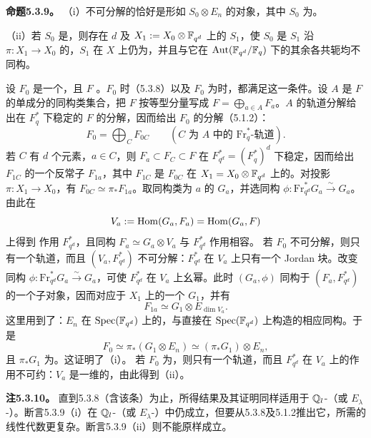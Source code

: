 \par\medskip\noindent\textbf{命题5.3.9。} （i）不可分解的恰好是形如 $S_0\otimes E_n$ 的对象，其中 $S_0$ 为。

（ii）若 $S_0$ 是，则存在 $d$ 及 $X_1:=X_0\otimes\mathbb F_{q^d}$ 上的 $S_1$，使 $S_0$ 是 $S_1$ 沿 $\pi:X_1\to X_0$ 的，$S_1$ 在 $X$ 上仍为，并且与它在 $\operatorname{Aut}(\mathbb F_{q^d}/\mathbb F_q)$ 下的其余各共轭均不同构。

设 $F_0$ 是一个，且 $F$ 。$F_0$ 时（5.3.8）以及 $F_0$ 为时，都满足这一条件。设 $A$ 是 $F$ 的单成分的同构类集合，把 $F$ 按等型分量写成 $F=\bigoplus_{a\in A}F_a$。$A$ 的轨道分解给出在 $F_q^*$ 下稳定的 $F$ 的分解，因而给出 $F_0$ 的分解（5.1.2）：
\[
F_0=\bigoplus_CF_{0C}\qquad(C\text{ 为 }A\text{ 中的 }\mathrm{Fr}_q^*\text{-轨道}).
\]
若 $C$ 有 $d$ 个元素，$a\in C$，则 $F_a\subset F_C\subset F$ 在 $F_{q^d}^*=(F_q^*)^d$ 下稳定，因而给出 $F_{1C}$ 的一个反常子 $F_{1a}$，其中 $F_{1C}$ 是 $F_{0C}$ 在 $X_1=X_0\otimes\mathbb F_{q^d}$ 上的。对投影 $\pi:X_1\to X_0$，有 $F_{0C}\simeq\pi_*F_{1a}$。取同构类为 $a$ 的 $G_a$，并选同构 $\phi:\mathrm{Fr}_{q^d}^*G_a\xrightarrow{\sim}G_a$。由此在
\[
V_a:=\operatorname{Hom}(G_a,F_a)=\operatorname{Hom}(G_a,F)
\]
上得到  作用 $F_{q^d}^*$，且同构 $F_a\simeq G_a\otimes V_a$ 与 $F_{q^d}^*$ 作用相容。
若 $F_0$ 不可分解，则只有一个轨道，而且 $(V_a,F_{q^d}^*)$ 不可分解：$F_{q^d}^*$ 在 $V_a$ 上只有一个 Jordan 块。改变同构 $\phi:\mathrm{Fr}_{q^d}^*G_a\xrightarrow{\sim}G_a$，可使 $F_{q^d}^*$ 在 $V_a$ 上幺幂。此时 $(G_a,\phi)$ 同构于 $(F_a,F_{q^d}^*)$ 的一个子对象，因而对应于 $X_1$ 上的一个 $G_1$，并有
\[
F_{1a}\simeq G_1\otimes E_{\dim V_a}.
\]
这里用到了：$E_n$ 在 $\operatorname{Spec}(\mathbb F_{q^d})$ 上的，与直接在 $\operatorname{Spec}(\mathbb F_{q^d})$ 上构造的相应同构。于是
\[
F_0\simeq\pi_*(G_1\otimes E_n)\simeq(\pi_*G_1)\otimes E_n,
\]
且 $\pi_*G_1$ 为。这证明了（i）。
若 $F_0$ 为，则只有一个轨道，而且 $F_{q^d}^*$ 在 $V_a$ 上的作用不可约：$V_a$ 是一维的，由此得到（ii）。

\par\medskip\noindent\textbf{注5.3.10。} 直到5.3.8（含该条）为止，所得结果及其证明同样适用于 $\mathbb Q_l$-（或 $E_\lambda$-）。断言5.3.9（i）在 $\mathbb Q_l$-（或 $E_\lambda$-）中仍成立，但要从5.3.8及5.1.2推出它，所需的线性代数更复杂。断言5.3.9（ii）则不能原样成立。

